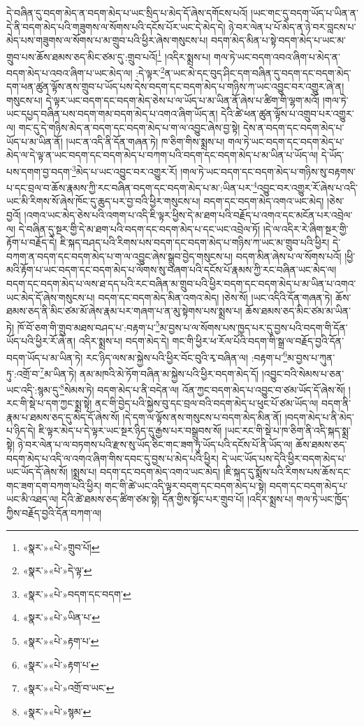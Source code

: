 དེ་བཞིན་དུ་བདག་མེད་ན་བདག་མེད་པ་ཡང་སྲིད་པ་མེད་དོ་ཞེས་དགོངས་པའོ། །ཡང་གང་དུ་བདག་ཡོད་པ་ཡིན་ན་དེ་ནི་བདག་མེད་པའི་གཟུགས་ལ་སོགས་པའི་དངོས་པོར་ཡང་དེ་མེད་དེ། ཉེ་བར་ལེན་པ་པོ་མེད་ན་ཉེ་བར་བླངས་པ་མེད་པས་གཟུགས་ལ་སོགས་པ་མ་གྲུབ་པའི་ཕྱིར་ཞེས་གསུངས་པ། བདག་མེད་མིན་པ་སྟེ་བདག་མེད་པ་ཡང་མ་གྲུབ་པས་ཆོས་ཐམས་ཅད་མིང་ཙམ་དུ་:གྲུབ་པའོ།\footnote{«སྣར་»«པེ་»གྲུབ་པོ།} །འདིར་སྨྲས་པ། གལ་ཏེ་ཡང་བདག་འབའ་ཞིག་པ་མེད་ན་བདག་མེད་པ་འབའ་ཞིག་པ་ཡང་མེད་ལ། :དེ་ལྟར་\footnote{«སྣར་»«པེ་»དེ་ལྟ་}ན་ཡང་མེ་དང་བུད་ཤིང་དག་བཞིན་དུ་བདག་དང་བདག་མེད་དག་ཕན་ཚུན་ལྟོས་ནས་གྲུབ་པ་ཡོད་པས་དེས་བདག་དང་བདག་མེད་པ་གཉིས་ཀ་ཡང་འབྱུང་བར་འགྱུར་ཞེ་ན། གསུངས་པ། དེ་ལྟར་ཡང་བདག་དང་བདག་མེད་ཅེས་པ་ལ་ཡོད་པ་མ་ཡིན་ནོ་ཞེས་པ་ཚིག་གི་ལྷག་མའོ། །གལ་ཏེ་ཡང་དཔྱད་བཞིན་པས་བདག་གམ་བདག་མེད་པ་འགའ་ཞིག་ཡོད་ན། དེའི་ཚེ་ཕན་ཚུན་ལྟོས་པ་འགྲུབ་པར་འགྱུར་ལ། གང་དུ་དེ་གཉིས་མེད་ན་བདག་དང་བདག་མེད་པ་ག་ལ་འབྱུང་ཞེས་བྱ་སྟེ། དེས་ན་བདག་དང་བདག་མེད་པ་ཡོད་པ་མ་ཡིན་ནོ། །ཡང་ན་འདི་ནི་དོན་གཞན་ཏེ། ཁ་ཅིག་གིས་སྨྲས་པ། གལ་ཏེ་ཡང་བདག་དང་བདག་མེད་པ་མེད་ལ་དེ་ལྟ་ན་ཡང་བདག་དང་བདག་མེད་པ་བཀག་པའི་བདག་དང་བདག་མེད་པ་མ་ཡིན་པ་ཡོད་ལ། དེ་ཡོད་པས་དགག་བྱ་བདག་\footnote{«སྣར་»«པེ་»བདག་དང་བདག་}མེད་པ་ཡང་འབྱུང་བར་འགྱུར་རོ། །གལ་ཏེ་ཡང་བདག་དང་བདག་མེད་པ་གཉིས་སུ་བརྟགས་པ་དང་བྲལ་བ་ཆོས་རྣམས་ཀྱི་རང་བཞིན་བདག་དང་བདག་མེད་པ་མ་:ཡིན་པར་\footnote{«སྣར་»«པེ་»ཡིན་པ་}འབྱུང་བར་འགྱུར་རོ་ཞེས་པ་འདི་ཡང་མི་རིགས་སོ་ཞེས་ཁོང་དུ་ཆུད་པར་བྱ་བའི་ཕྱིར་གསུངས་པ། བདག་དང་བདག་མེད་འགའ་ཡང་མེད། །ཅེས་བྱའོ། །འགའ་ཡང་མེད་ཅེས་པའི་འགག་པ་འདི་ཇི་ལྟར་ཕྱིས་དེ་མ་ཐག་པའི་བརྗོད་པ་འགའ་དང་མངོན་པར་འབྲེལ་ལ། དེ་བཞིན་དུ་སྔར་གྱི་དེ་མ་ཐག་པའི་བདག་དང་བདག་མེད་པ་དང་ཡང་འབྲེལ་ཏོ། །དེ་ལ་འདིར་རེ་ཞིག་སྔར་གྱི་རྟོག་པ་བརྗོད་དེ། ཇི་སྐད་བཤད་པའི་རིགས་པས་བདག་དང་བདག་མེད་པ་གཉིས་ཀ་ཡང་མ་གྲུབ་པའི་ཕྱིར། དེ་བཀག་ན་བདག་དང་བདག་མེད་པ་ག་ལ་འབྱུང་ཞེས་སྒྲུབ་བྱེད་གསུངས་པ། བདག་མིན་ཞེས་པ་ལ་སོགས་པའོ། །ཕྱི་མའི་རྟོག་པ་ཡང་བདག་དང་བདག་མེད་པ་ལོགས་སུ་བཞག་པའི་དངོས་པོ་རྣམས་ཀྱི་རང་བཞིན་ཡང་མེད་ལ། བདག་དང་བདག་མེད་པ་ལས་ཐ་དད་པའི་རང་བཞིན་མ་གྲུབ་པའི་ཕྱིར་བདག་དང་བདག་མེད་པ་མ་ཡིན་པ་འགའ་ཡང་མེད་དོ་ཞེས་གསུངས་པ། བདག་དང་བདག་མེད་མིན་འགའ་མེད། །ཅེས་སོ། །ཡང་འདིའི་དོན་གཞན་ཏེ། ཆོས་ཐམས་ཅད་ནི་མིང་ཙམ་མོ་ཞེས་རྣམ་པར་གཞག་པ་ན་མུ་སྟེགས་པས་སྨྲས་པ། ཆོས་ཐམས་ཅད་མིང་ཙམ་མ་ཡིན་ཏེ། ཁོ་བོ་ཅག་གི་གྲུབ་མཐས་བཤད་པ་:བརྟག་པ་\footnote{«སྣར་»«པེ་»རྟག་པ་}མ་བྱས་པ་ལ་སོགས་པས་ཁྱད་པར་དུ་བྱས་པའི་བདག་གི་དོན་ཡོད་པའི་ཕྱིར་རོ་ཞེ་ན། འདིར་སྨྲས་པ། བདག་མེད་དེ། གང་གི་ཕྱིར་ཕ་རོལ་པོའི་བདག་གི་སྒྲ་ལ་བརྗོད་བྱའི་དོན་བདག་ཡོད་པ་མ་ཡིན་ཏེ། རང་ཉིད་ལས་མ་སྐྱེས་པའི་ཕྱིར་བོང་བུའི་རྭ་བཞིན་ལ། :བརྟག་པ་\footnote{«སྣར་»«པེ་»རྟག་པ་}མ་བྱས་པ་ཀུན་ཏུ་:འགྲོ་བ་\footnote{«སྣར་»«པེ་»འགྲོ་བ་ཡང་}མ་ཡིན་ཏེ། ནམ་མཁའི་མེ་ཏོག་བཞིན་མ་སྐྱེས་པའི་ཕྱིར་བདག་མེད་དོ། །འབྱུང་བའི་སེམས་པ་ཅན་ཡང་འདི་:སྙམ་དུ་\footnote{«སྣར་»«པེ་»སྙམ་}སེམས་ཏེ། བདག་མེད་པ་ནི་བདེན་ལ། འོན་ཀྱང་བདག་མེད་པ་འབྱུང་བ་ཙམ་ཡོད་དོ་ཞེས་སོ། །རང་གི་སྡེ་པ་དག་ཀྱང་སྨྲ་སྟེ། ནང་གི་བྱེད་པའི་སྐྱེས་བུ་དང་བྲལ་བའི་བདག་མེད་པ་ཕུང་པོ་ཙམ་ཡོད་ལ། བདག་ནི་རྣམ་པ་ཐམས་ཅད་དུ་མེད་དོ་ཞེས་སོ། །དེ་དག་ལ་ལྟོས་ནས་གསུངས་པ་བདག་མེད་མིན་ནོ། །བདག་མེད་པ་ནི་མེད་པ་ཉིད་དེ། ཇི་ལྟར་མེད་པ་དེ་ལྟར་ཡང་སྔར་ཉིད་དུ་རྒྱས་པར་བསྒྲུབས་སོ། །ཡང་རང་གི་སྡེ་པ་ཁ་ཅིག་ནི་འདི་སྐད་སྨྲ་སྟེ། ཉེ་བར་ལེན་པ་ལ་བཏགས་པའི་རྫས་སུ་ཡོད་ཅིང་གང་ཟག་ཏུ་ཡོད་པའི་དངོས་པོ་ནི་ཡོད་ལ། ཆོས་ཐམས་ཅད་བདག་མེད་པ་འདི་ལ་འགའ་ཞིག་གིས་དབང་དུ་བྱས་པ་མེད་པའི་ཕྱིར། དེ་ཡང་ཡོད་པས་དེའི་ཕྱིར་བདག་མེད་པ་ཡང་ཡོད་དོ་ཞེས་སོ། །སྨྲས་པ། བདག་དང་བདག་མེད་འགའ་ཡང་མེད། །ཇི་སྐད་དུ་སྨོས་པའི་རིགས་པས་ཆོས་དང་གང་ཟག་དག་བཀག་པའི་ཕྱིར། གང་གི་ཚེ་ཡང་འདི་ལྟར་བདག་དང་བདག་མེད་པ་སྟེ། བདག་དང་བདག་མེད་པ་ཡང་མི་འཐད་ལ། དེའི་ཚེ་ཐམས་ཅད་ཚིག་ཙམ་སྟེ། དོན་གྱིས་སྟོང་པར་གྲུབ་པོ། །འདིར་སྨྲས་པ། གལ་ཏེ་ཡང་ཁྱོད་ཀྱིས་བརྗོད་བྱའི་དོན་བཀག་ལ། 
